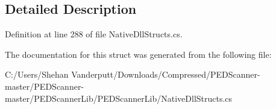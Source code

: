 \subsection{Detailed Description}


Definition at line 288 of file Native\+Dll\+Structs.\+cs.



The documentation for this struct was generated from the following file\+:\begin{DoxyCompactItemize}
\item 
C\+:/\+Users/\+Shehan Vanderputt/\+Downloads/\+Compressed/\+P\+E\+D\+Scanner-\/master/\+P\+E\+D\+Scanner-\/master/\+P\+E\+D\+Scanner\+Lib/\+P\+E\+D\+Scanner\+Lib/Native\+Dll\+Structs.\+cs\end{DoxyCompactItemize}
